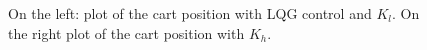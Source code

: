   \begin{figure}[!tbh]
  \centering
  \hfill
  \caption{On the left: plot of the cart position with LQG control and $K_l$. On the right plot of the cart position with $K_h$.}
    \label{fig:poss}
\end{figure}